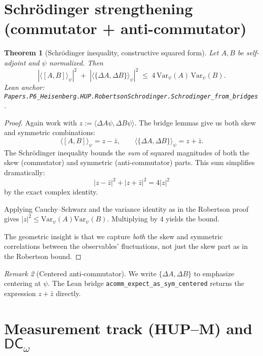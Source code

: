 \documentclass[11pt]{article}
\newcommand{\DCw}{\mathsf{DC}_{\omega}}
\newcommand{\lean}[1]{\texttt{#1}}
\newcommand{\leanok}{\text{\tiny [✓ Lean Verified]}}
\newcommand{\ip}[2]{\langle #1, #2 \rangle}
\newcommand{\E}[1]{\langle #1 \rangle}
\newcommand{\comm}[2]{[#1, #2]}
\newcommand{\acomm}[2]{\{#1, #2\}} %
\newcommand{\absC}[1]{\left| #1 \right|}
\newcommand{\abssq}[1]{\absC{#1}^{2}}
\newcommand{\Var}{\mathrm{Var}}
\theoremstyle{plain}
\newtheorem{theorem}{Theorem}[section]
\theoremstyle{definition}
\theoremstyle{remark}
\newtheorem{remark}[theorem]{Remark}
\begin{document}
\section{Schrödinger strengthening (commutator + anti-commutator)}
\label{sec:Schrodinger}

\begin{theorem}[Schrödinger inequality, constructive squared form]\leanok
\label{thm:Schrodinger-squared}
Let $A,B$ be self-adjoint and $\psi$ normalized. Then
\[
  \abssq{\E{\comm{A}{B}}_\psi}
  \;+\;
  \abssq{\E{\acomm{\Delta A}{\Delta B}}_\psi}
  \;\le\; 4\,\Var_\psi(A)\,\Var_\psi(B).
\]
\emph{Lean anchor:} \lean{Papers.P6\_Heisenberg.HUP.RobertsonSchrodinger.Schrodinger\_from\_bridges}.
\end{theorem}

\begin{proof}
Again work with $z := \ip{\Delta A\psi}{\Delta B\psi}$. The bridge lemmas give us both skew and symmetric combinations:
\[
\E{\comm{A}{B}}_\psi = z - \bar{z}, \qquad \E{\acomm{\Delta A}{\Delta B}}_\psi = z + \bar{z}.
\]
The Schrödinger inequality bounds the \emph{sum} of squared magnitudes of both the skew (commutator) and symmetric (anti-commutator) parts. This sum simplifies dramatically:
\[
\abssq{z - \bar{z}} + \abssq{z + \bar{z}} = 4\abssq{z}
\]
by the exact complex identity.

Applying Cauchy--Schwarz and the variance identity as in the Robertson proof gives $\abssq{z} \leq \Var_\psi(A)\Var_\psi(B)$. Multiplying by $4$ yields the bound.

The geometric insight is that we capture \emph{both} the skew and symmetric correlations between the observables' fluctuations, not just the skew part as in the Robertson bound.
\end{proof}

\begin{remark}[Centered anti-commutator]
We write $\acomm{\Delta A}{\Delta B}$ to emphasize centering at $\psi$.
The Lean bridge \lean{acomm\_expect\_as\_sym\_centered} returns the expression $z+\bar z$ directly.
\end{remark}

\section{Measurement track (HUP--M) and $\DCw$}
\label{sec:measurement-DC}
\end{document}
